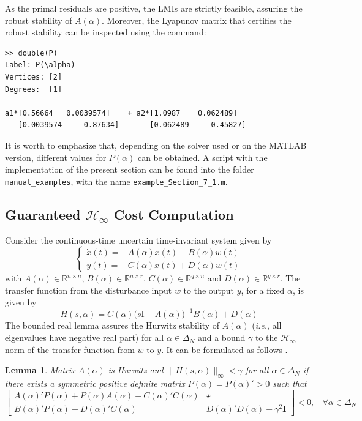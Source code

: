 \documentclass[english,11pt]{article}
\theoremstyle{break} \theorembodyfont{\small\rm}
\newtheorem{lema}{\bf Lemma}
\newenvironment{Plema}
{\begin{lema}} {\hspace*{\fill}\nolinebreak[1]
\end{lema}
}
\newcommand{\Hi}{{\mathcal{H}}_{\infty}}
\begin{document}
As the primal residuals are positive, the LMIs are strictly feasible, assuring the robust stability of $A(\alpha)$. Moreover, the Lyapunov matrix that certifies the robust stability can be inspected using the command:

\begin{minipage}{15.0cm}
\begin{lstlisting}[rulecolor=\color{red}]
>> double(P)
Label: P(\alpha)
Vertices: [2]
Degrees:  [1]

a1*[0.56664   0.0039574]    + a2*[1.0987    0.062489]   
   [0.0039574     0.87634]       [0.062489     0.45827] 
\end{lstlisting}
\end{minipage}

It is worth to emphasize that, depending on the solver used or on the MATLAB version, different values for $P(\alpha)$ can be obtained.
A script with the implementation of the present section can be found into the folder \texttt{manual\_examples}, with the name
\texttt{example\_Section\_7\_1.m}.

\subsection{Guaranteed $\Hi$ Cost Computation}\label{sec_example}

Consider the continuous-time uncertain time-invariant system
given by
\begin{equation}\label{eq_syst}
\left\{\begin{array}{rl}
\dot{x}(t) = & A(\alpha)x(t) + B(\alpha)w(t)\\
y(t) = & C(\alpha)x(t) + D(\alpha)w(t)
\end{array}\right.
\end{equation}
with $A(\alpha) \in \mathbb{R}^{n \times n}$, $B(\alpha) \in \mathbb{R}^{n \times r}$,
$C(\alpha) \in \mathbb{R}^{q \times n}$ and $D(\alpha) \in \mathbb{R}^{q \times r}$.
The transfer function from the disturbance input $w$ to the output $y$, for a fixed $\alpha$,
is given by
\[
 H(s,\alpha) = C(\alpha) \big( s \mbox{I} - A(\alpha) \big)^{-1} B(\alpha) + D(\alpha)
\]
The bounded real lemma assures the Hurwitz stability of $A(\alpha)$
(\textit{i.e.}, all eigenvalues have negative real part)
for all $\alpha \in \Delta_N$ and a bound $\gamma$ to the $\Hi$ norm of the transfer 
function from $w$ to $y$. It can be formulated as follows \cite{BEFB:94}.  

\begin{Plema}
Matrix $A(\alpha)$ is Hurwitz and $\| H(s,\alpha) \|_{\infty} < \gamma$ for all $\alpha \in \Delta_N$
if there exists a symmetric positive definite matrix $P(\alpha) = P(\alpha)' > 0$
such that 
\begin{equation}\label{eq_cond_hinf}
\left[ \begin{matrix}
A(\alpha)'P(\alpha) + P(\alpha)A(\alpha) + C(\alpha)'C(\alpha) &  \star\\
B(\alpha)'P(\alpha) + D(\alpha)'C(\alpha) & D(\alpha)'D(\alpha) - \gamma^2\mathbf{I}
\end{matrix}  \right]
  < 0 ,  ~~~~\forall \alpha \in \Delta_N
\end{equation}
\end{Plema}
\end{document}
